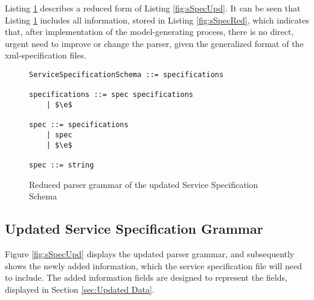 Listing \ref{fig:sSpecUpdRed} describes a reduced form of Listing \ref{fig:sSpecUpd}. It can be seen that Listing \ref{fig:sSpecUpdRed} includes all information, stored in Listing \ref{fig:sSpecRed}, which indicates that, after implementation of the model-generating process, there is no direct, urgent need to improve or change the parser, given the generalized format of the xml-specification files.

\begin{figure}[h]
	\centering
	\begin{lstlisting}[keywordstyle={}]
ServiceSpecificationSchema ::= specifications

specifications ::= spec specifications
    | $\e$
     
spec ::= specifications
    | spec
    | $\e$

spec ::= string
	\end{lstlisting}
	\caption{Reduced parser grammar of the updated Service Specification Schema}
	\label{fig:sSpecUpdRed}
\end{figure}

\subsection{Updated Service Specification Grammar}

Figure \ref{fig:sSpecUpd} displays the updated parser grammar, and subsequently shows the newly added information, which the service specification file will need to include. The added information fields are designed to represent the fields, displayed in Section \ref{sec:Updated Data}.

